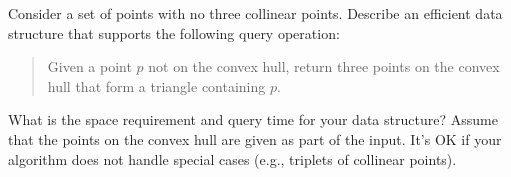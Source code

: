 Consider a set of points with no three collinear points.  Describe an
efficient data structure that supports the following query operation:
%
\begin{quote}

Given a point $p$ not on the convex hull, return three points on the
convex hull that form a triangle containing $p$.

\end{quote}
%
What is the space requirement and query time for your data structure?
Assume that the points on the convex hull are given as part of the
input.  It's OK if your algorithm does not handle special cases (e.g.,
triplets of collinear points).

